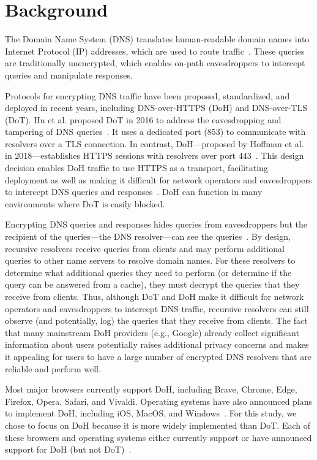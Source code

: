 \section{Background}\label{sec:background}

The Domain Name System (DNS) translates human-readable domain names into
Internet Protocol (IP) addresses, which are used to route
traffic~\cite{dns-rfcs}.  These queries are traditionally unencrypted, which
enables on-path eavesdroppers to intercept queries and manipulate responses.

Protocols for encrypting DNS traffic have been proposed, standardized, and
deployed in recent years, including DNS-over-HTTPS (DoH) and DNS-over-TLS
(DoT).  Hu et al. proposed DoT in 2016 to address the eavesdropping and
tampering of DNS queries~\cite{hu2016DoT}.  It uses a dedicated port (853)
to communicate with resolvers over a TLS connection.  In contrast,
DoH---proposed by Hoffman et al. in 2018---establishes HTTPS sessions with
resolvers over port 443~\cite{hoffman2018DoH}.  This design decision enables
DoH traffic to use HTTPS as a transport, facilitating deployment as well as
making it difficult for network operators and eavesdroppers to intercept DNS
queries and responses~\cite{boettger2019empirical}. DoH can function in many
environments where DoT is easily blocked.

Encrypting DNS queries and responses hides queries from eavesdroppers but the
recipient of the queries---the DNS resolver---can see the
queries~\cite{IEEEfight}. By design, recursive resolvers receive queries from
clients and may perform additional queries to other name servers to resolve
domain names.  For these resolvers to determine what additional
queries they need to perform (or determine if the query can be answered from a
cache), they must decrypt the queries that they receive from clients.  Thus,
although DoT and DoH make it difficult for network operators and eavesdroppers
to intercept DNS traffic, recursive resolvers can still
observe (and potentially, log) the queries that they receive from clients.
The fact that many mainstream DoH providers (e.g., Google) already collect
significant information about users potentially raises additional privacy
concerns and makes it appealing for users to have a large number of encrypted
DNS resolvers that are reliable and perform well.

Most major browsers currently support DoH, including Brave, Chrome, Edge,
Firefox, Opera, Safari, and Vivaldi.  Operating systems have also announced
plans to implement DoH, including iOS, MacOS, and
Windows~\cite{ffSettings,operaEdgeSettings,vivaldiSettings,iosSettings,jensen2020windows}.
For this study, we chose to focus on DoH because it is more widely implemented
than DoT.  Each of these browsers and operating systems either
currently support or have announced support for DoH (but not
DoT)~\cite{lack-of-dot-support}.

